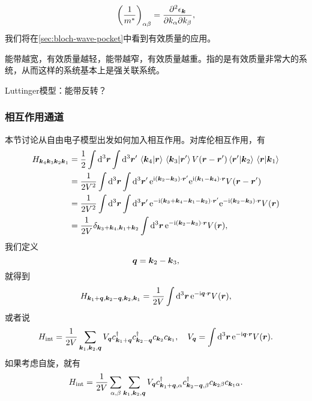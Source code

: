 \begin{equation}
    \left(\frac{1}{m^*}\right)_{\alpha \beta} = \pdv[2]{\epsilon_{\vb*{k}}}{k_\alpha}{k_\beta},
    \label{eq:effective-mass}
\end{equation}
我们将在\autoref{sec:bloch-wave-pocket}中看到有效质量的应用。

能带越宽，有效质量越轻，能带越窄，有效质量越重。指的是有效质量非常大的系统，从而这样的系统基本上是强关联系统。

Luttinger模型：能带反转？

\subsubsection{相互作用通道}\label{sec:interaction-bloch}

本节讨论从自由电子模型出发如何加入相互作用。对库伦相互作用，有
\[
    \begin{aligned}
        H_{\vb*{k}_4 \vb*{k}_3 \vb*{k}_2 \vb*{k}_1} &= \frac{1}{2} \int \dd[3]{\vb*{r}} \int \dd[3]{\vb*{r}'} \braket*{\vb*{k}_4}{\vb*{r}} \braket*{\vb*{k}_3}{\vb*{r}'} V(\vb*{r} - \vb*{r}') \braket*{\vb*{r}'}{\vb*{k}_2} \braket*{\vb*{r}}{\vb*{k}_1}  \\
        &= \frac{1}{2 V^2} \int \dd[3]{\vb*{r}} \int \dd[3]{\vb*{r}'} \mathrm{e}^{\mathrm{i} (\vb*{k}_2 - \vb*{k}_3) \cdot \vb*{r}'} \mathrm{e}^{\mathrm{i} (\vb*{k}_1 - \vb*{k}_4) \cdot \vb*{r}} V(\vb*{r} - \vb*{r}') \\
        &= \frac{1}{2V^2} \int \dd[3]{\vb*{r}} \int \dd[3]{\vb*{r}'} \mathrm{e}^{- \mathrm{i} (\vb*{k}_3 + \vb*{k}_4 - \vb*{k}_1 - \vb*{k}_2) \cdot \vb*{r}'} \mathrm{e}^{- \mathrm{i}(\vb*{k}_2 - \vb*{k}_3) \cdot \vb*{r}} V(\vb*{r}) \\
        &= \frac{1}{2V} \delta_{\vb*{k}_3 + \vb*{k}_4, \vb*{k}_1 + \vb*{k}_2} \int \dd[3]{\vb*{r}} \mathrm{e}^{- \mathrm{i} (\vb*{k}_2 - \vb*{k}_3) \cdot \vb*{r}} V(\vb*{r}),
    \end{aligned}
\]
我们定义
\[
    \vb*{q} = \vb*{k}_2 - \vb*{k}_3,
\]
就得到
\begin{equation}
    H_{\vb*{k}_1 + \vb*{q}, \vb*{k}_2 - \vb*{q}, \vb*{k}_2, \vb*{k}_1} = \frac{1}{2V} \int \dd[3]{\vb*{r}} \mathrm{e}^{- \mathrm{i} \vb*{q} \cdot \vb*{r}} V(\vb*{r}),
\end{equation}
或者说
\begin{equation}
    H_\text{int} = \frac{1}{2V} \sum_{\vb*{k}_1, \vb*{k}_2, \vb*{q}} V_{\vb*{q}} c^\dagger_{\vb*{k}_1 + \vb*{q}} c^\dagger_{\vb*{k}_2 - \vb*{q}} c_{\vb*{k}_2} c_{\vb*{k}_1} , \quad V_{\vb*{q}} = \int \dd[3]{\vb*{r}} \mathrm{e}^{- \mathrm{i} \vb*{q} \cdot \vb*{r}} V(\vb*{r}).
\end{equation}
如果考虑自旋，就有
\begin{equation}
    H_\text{int} = \frac{1}{2V} \sum_{\alpha, \beta} \sum_{\vb*{k}_1, \vb*{k}_2, \vb*{q}} V_{\vb*{q}} c^\dagger_{\vb*{k}_1 + \vb*{q}, \alpha} c^\dagger_{\vb*{k}_2 - \vb*{q}, \beta} c_{\vb*{k}_2 \beta} c_{\vb*{k}_1 \alpha}.
\end{equation}

